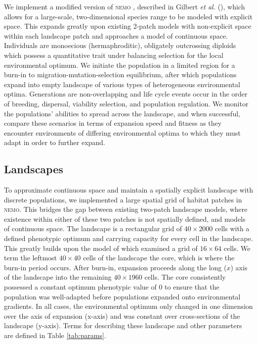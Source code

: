 We implement a modified version of \textsc{nemo} \citep{Guillaume:2006}, described in Gilbert \emph{et al.} (), which allows for a large-scale, two-dimensional species range to be modeled with explicit space. This expands greatly upon existing 2-patch models with non-explicit space within each landscape patch and approaches a model of continuous space. Individuals are monoecious (hermaphroditic), obligately outcrossing diploids which possess a quantitative trait under balancing selection for the local environmental optimum. We initiate the population in a limited region for a burn-in to migration-mutation-selection equilibrium, after which populations expand into empty landscape of various types of heterogeneous environmental optima. Generations are non-overlapping and life cycle events occur in the order of breeding, dispersal, viability selection, and population regulation. We monitor the populations' abilities to spread across the landscape, and when successful, compare these scenarios in terms of expansion speed and fitness as they encounter environments of differing environmental optima to which they must adapt in order to further expand.


\subsection{Landscapes}

To approximate continuous space and maintain a spatially explicit landscape with discrete populations, we implemented a large spatial grid of habitat patches in \textsc{nemo}. This bridges the gap between existing two-patch landscape models, where existence within either of these two patches is not spatially defined, and models of continuous space. The landscape is a rectangular grid of $40\times2000$ cells with a defined phenotypic optimum and carrying capacity for every cell in the landscape. 
This greatly builds upon the model of \citet{Schiffers:2014} which examined a grid of $16\times64$ cells. We term the leftmost $40\times40$ cells of the landscape the core, which is where the burn-in period occurs. After burn-in, expansion proceeds along the long ($x$) axis of the landscape into the remaining $40\times1960$ cells. The core consistently possessed a constant optimum phenotypic value of $0$ to ensure that the population was well-adapted before populations expanded onto environmental gradients. In all cases, the environmental optimum only changed in one dimension over the axis of expansion (x-axis) and was constant over cross-sections of the landscape (y-axis). Terms for describing these landscape and other parameters are defined in Table \ref{tab:params}.

